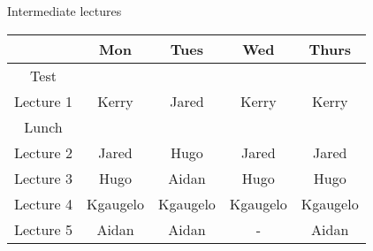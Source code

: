 \documentclass{article}
\begin{document}
\begin{center}
\Large
Intermediate lectures

\begin{tabular}{|c|c|c|c|c|}
\hline
& \textbf{Mon} & \textbf{Tues} & \textbf{Wed} & \textbf{Thurs} \\ \hline
Test &  &  &  &  \\ \hline
Lecture 1 & Kerry & Jared & Kerry & Kerry \\ \hline
Lunch &  &  &  &  \\ \hline
Lecture 2 & Jared & Hugo & Jared & Jared \\ \hline
Lecture 3 & Hugo & Aidan & Hugo & Hugo \\ \hline
Lecture 4 & Kgaugelo & Kgaugelo & Kgaugelo & Kgaugelo \\ \hline
Lecture 5 & Aidan & Aidan & - & Aidan \\ \hline
\end{tabular}
\end{center}
\end{document}
